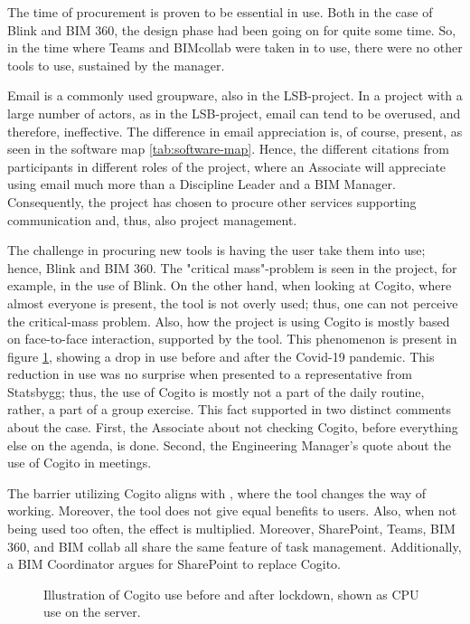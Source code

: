The time of procurement is proven to be essential in use. Both in the case of Blink and BIM 360, the design phase had been going on for quite some time. So, in the time where Teams and BIMcollab were taken in to use, there were no other tools to use, sustained by the manager.

Email is a commonly used groupware, also in the LSB-project. In a project with a large number of actors, as in the LSB-project, email can tend to be overused, and therefore, ineffective. The difference in email appreciation is, of course, present, as seen in the software map \ref{tab:software-map}. Hence, the different citations from participants in different roles of the project, where an Associate will appreciate using email much more than a Discipline Leader and a BIM Manager. Consequently, the project has chosen to procure other services supporting communication and, thus, also project management.

The challenge in procuring new tools is having the user take them into use; hence, Blink and BIM 360. The "critical mass"-problem \citep{markus1987toward} is seen in the project, for example, in the use of Blink. On the other hand, when looking at Cogito, where almost everyone is present, the tool is not overly used; thus, one can not perceive the critical-mass problem. Also, how the project is using Cogito is mostly based on face-to-face interaction, supported by the tool. This phenomenon is present in figure \ref{fig:cogito_use}, showing a drop in use before and after the Covid-19 pandemic. This reduction in use was no surprise when presented to a representative from Statsbygg; thus, the use of Cogito is mostly not a part of the daily routine, rather, a part of a group exercise. This fact supported in two distinct comments about the case. First, the Associate about not checking Cogito, before everything else on the agenda, is done. Second, the Engineering Manager's quote about the use of Cogito in meetings. 

The barrier utilizing Cogito aligns with \citet{grudin1989groupware}, where the tool changes the way of working. Moreover, the tool does not give equal benefits to users. Also, when not being used too often, the effect is multiplied. Moreover, SharePoint, Teams, BIM 360, and BIM collab all share the same feature of task management. Additionally, a BIM Coordinator argues for SharePoint to replace Cogito.

\begin{figure}
    \centering

    \caption{Illustration of Cogito use before and after lockdown, shown as CPU use on the server.}
    \label{fig:cogito_use}
\end{figure}

